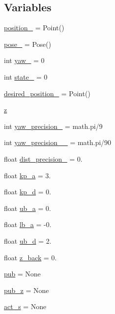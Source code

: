 \subsection*{Variables}
\begin{DoxyCompactItemize}
\item 
\hyperlink{namespacego__to__point__robot_acbca47166b9d5f046eaeadf1287f52c4}{position\+\_\+} = Point()
\item 
\hyperlink{namespacego__to__point__robot_a9ac7f45f0d64cf9ef7666d1f825ef9ba}{pose\+\_\+} = Pose()
\item 
int \hyperlink{namespacego__to__point__robot_af0544cdffc791a807b9062c979cf0c3d}{yaw\+\_\+} = 0
\item 
int \hyperlink{namespacego__to__point__robot_a68762504c0683adedb89a8f7d431f475}{state\+\_\+} = 0
\item 
\hyperlink{namespacego__to__point__robot_ab42eca5c5072ff7b4d95c8e13827dba7}{desired\+\_\+position\+\_\+} = Point()
\item 
\hyperlink{namespacego__to__point__robot_ad3b22a785c833ad2cdd10712a66f11c8}{z}
\item 
int \hyperlink{namespacego__to__point__robot_ad0131301589fb7d3d9462cff81932fcf}{yaw\+\_\+precision\+\_\+} = math.\+pi/9
\item 
int \hyperlink{namespacego__to__point__robot_aadcca20dfdd8e843623186e6efde0481}{yaw\+\_\+precision\+\_\+\_\+} = math.\+pi/90
\item 
float \hyperlink{namespacego__to__point__robot_adce474cb3bcc2782904a1e6129217a4c}{dist\+\_\+precision\+\_\+} = 0.
\item 
float \hyperlink{namespacego__to__point__robot_ab9bae8b08a7c50f11e55e3fae44f7777}{kp\+\_\+a} = 3.
\item 
float \hyperlink{namespacego__to__point__robot_afaac446f10588cd97bfda3bf31c3b670}{kp\+\_\+d} = 0.
\item 
float \hyperlink{namespacego__to__point__robot_a82aa92171409b5a766ecc7ec77f1488f}{ub\+\_\+a} = 0.
\item 
float \hyperlink{namespacego__to__point__robot_a0a5daf54d4f98b8898f69fc331bcc1f0}{lb\+\_\+a} = -\/0.
\item 
float \hyperlink{namespacego__to__point__robot_aa54f25328ab1ea2787c879431057298f}{ub\+\_\+d} = 2.
\item 
float \hyperlink{namespacego__to__point__robot_aa3df6e395e3d2ee11f4f87c88bde46bb}{z\+\_\+back} = 0.
\item 
\hyperlink{namespacego__to__point__robot_a6e68302a4efb615222a73c01f4ea514e}{pub} = None
\item 
\hyperlink{namespacego__to__point__robot_a77fda65f973b534ac0506f422d861fbc}{pub\+\_\+z} = None
\item 
\hyperlink{namespacego__to__point__robot_ab19ed2eba072e150275e059ca41a4cfc}{act\+\_\+s} = None
\end{DoxyCompactItemize}



